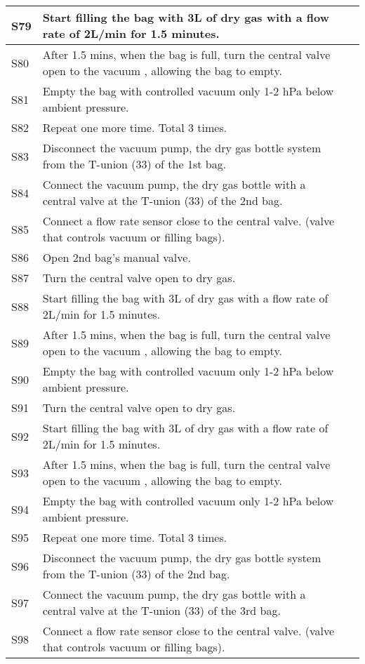\begin{longtable} {|m{}|m{}|m{}|}
S79 & Start filling the bag with 3L of dry gas with a flow rate of 2L/min for 1.5 minutes. & \\ \hline
S80 & After 1.5 mins, when the bag is full, turn the central valve open to the vacuum , allowing the bag to empty. & \\ \hline
S81 & Empty the bag with controlled vacuum only 1-2 hPa below ambient pressure. & \\ \hline
S82 & Repeat one more time. Total 3 times. & \\ \hline
S83 & Disconnect the vacuum pump, the dry gas bottle system from the T-union (33) of the 1st bag. & \\ \hline
S84 & Connect the vacuum pump, the dry gas bottle with a central valve at the T-union (33) of the 2nd bag. & \\ \hline
S85 & Connect a flow rate sensor close to the central valve. (valve that controls vacuum or filling bags). & \\ \hline
S86 & Open 2nd bag's manual valve. & \\ \hline
S87 & Turn the central valve open to dry gas. & \\ \hline
S88 & Start filling the bag with 3L of dry gas with a flow rate of 2L/min for 1.5 minutes. & \\ \hline
S89 & After 1.5 mins, when the bag is full, turn the central valve open to the vacuum , allowing the bag to empty. & \\ \hline
S90 & Empty the bag with controlled vacuum only 1-2 hPa below ambient pressure. & \\ \hline
S91 & Turn the central valve open to dry gas. & \\ \hline
S92 & Start filling the bag with 3L of dry gas with a flow rate of 2L/min for 1.5 minutes. & \\ \hline
S93 & After 1.5 mins, when the bag is full, turn the central valve open to the vacuum , allowing the bag to empty. & \\ \hline
S94 & Empty the bag with controlled vacuum only 1-2 hPa below ambient pressure. & \\ \hline
S95 & Repeat one more time. Total 3 times. & \\ \hline
S96 & Disconnect the vacuum pump, the dry gas bottle system from the T-union (33) of the 2nd bag. & \\ \hline
S97 & Connect the vacuum pump, the dry gas bottle with a central valve at the T-union (33) of the 3rd bag. & \\ \hline
S98 & Connect a flow rate sensor close to the central valve. (valve that controls vacuum or filling bags). & \\ \hline

\end{longtable}

